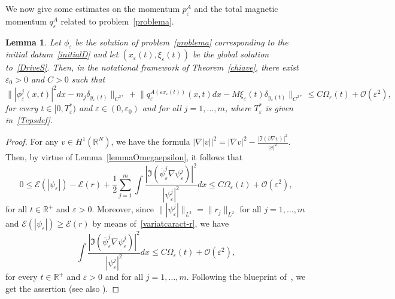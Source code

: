 \documentclass[11pt]{amsart}
\numberwithin{equation}{section}
\newtheorem{lemma}[theorem]{Lemma}
\theoremstyle{definition}
\begin{document}
We now give some estimates on the momentum $p_{\varepsilon}^A$
and the total magnetic momentum $q_{\varepsilon}^A$ related to
problem~\eqref{problema}.

\begin{lemma}\label{tec1}
Let $\phi_{\varepsilon}$ be the solution of problem~\eqref{problema}
corresponding to the initial datum~\eqref{initialD} and let $(x_{\varepsilon}(t),
\xi_{\varepsilon}(t))$ be the global solution to~\eqref{DriveS}. Then, in the notational framework
of Theorem~\ref{chiave}, there exist ${\varepsilon}_0>0$ and $C>0$ such that
\begin{equation*}
\big\| |\phi_{\varepsilon}^j(x,t)|^2dx-m_j\delta_{y_{\varepsilon}(t)}\big\|_{C^{2*}}
+
\big\|q_{\varepsilon}^{A({\varepsilon} x_{\varepsilon}(t))}(x,t)dx-M\xi_{\varepsilon}(t)\delta_{y_{\varepsilon}(t)}\big\|_{C^{2*}}\leq
C\Omega_{\varepsilon}(t)+{\mathcal O}({\varepsilon}^2),
\end{equation*}
for every $t\in[0,T_{\varepsilon}^{*})$ and ${\varepsilon}\in(0,{\varepsilon}_{0})$ and for
all $j=1, \dots, m$, where $T_{\varepsilon}^*$ is given in~\eqref{Tepsdef}.
\end{lemma}

\begin{proof}
For any $v\in H^{1}({{\mathbb R}}^N)$, we have the formula $|\nabla
|v||^{2}=|\nabla v|^{2}-\frac{|{{\Im}}(\bar v\nabla
v)|^{2}}{|v|^{2}}$. Then, by virtue of
Lemma~\ref{lemmaOmegaepsilon}, it follows that
\begin{equation*}
0\leq \mathcal E(|\psi_{\varepsilon}|) -\mathcal E(r) +
\frac{1}{2}\sum_{j=1}^m\int\frac{|{{\Im}}(\bar \psi_{\varepsilon}^j\nabla
\psi_{\varepsilon}^j)|^{2}}{|\psi_{\varepsilon}^j|^{2}}dx\leq
C\Omega_{\varepsilon}(t)+{\mathcal O}({\varepsilon}^2),
\end{equation*}
for all $t\in {{\mathbb R}}^+$ and ${\varepsilon}>0$. Moreover, since
$\||\psi_{\varepsilon}^j|\|_{L^2}=\|r_j\|_{L^2}$ for all $j=1, \dots, m$
and $\mathcal E(|\psi_{\varepsilon}|)\geq \mathcal E(r)$
by means of~\eqref{variatcaract-r}, we have
\begin{equation}\label{dis1}
    \int\frac{|{{\Im}}(\bar \psi_{\varepsilon}^j\nabla \psi_{\varepsilon}^j)|^{2}}{|\psi_{\varepsilon}^j|^{2}}dx\leq C\Omega_{\varepsilon}(t)+{\mathcal O}({\varepsilon}^2),
\end{equation}
for every $t\in {{\mathbb R}}^+$ and ${\varepsilon}>0$ and for all $j=1, \dots, m$.
Following the blueprint of~\cite[Lemma~6.1]{squa}, we get the assertion
(see also \cite{squamont}).
\end{proof}
\end{document}
